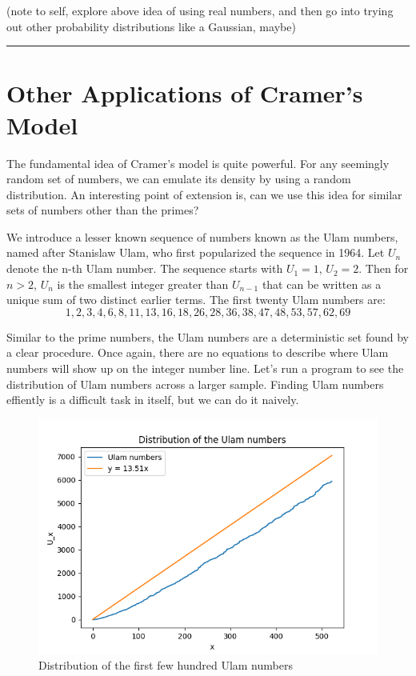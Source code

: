 \documentclass[conference]{IEEEtran}
\begin{document}
(note to self, explore above idea of using real numbers, and then
go into trying out other probability distributions like a Gaussian, maybe)

\vspace{2mm}
\hrule
\vspace{2mm}


\section{Other Applications of Cramer's Model}

The fundamental idea of Cramer's model is quite powerful. For any seemingly random set of numbers, we can emulate its density by using a random distribution. An interesting point of extension is, can we use this idea for similar sets of numbers other than the primes?

We introduce a lesser known sequence of numbers known as the Ulam numbers, named after Stanislaw Ulam, who first popularized the sequence in 1964. Let $U_n$ denote the n-th Ulam number. The sequence starts with $U_1 = 1$, $U_2 = 2$. Then for $n > 2$, $U_n$ is the smallest integer greater than $U_{n - 1}$ that can be written as a unique sum of two distinct earlier terms. The first twenty Ulam numbers are:
\[1, 2, 3, 4, 6, 8, 11, 13, 16, 18, 26, 28, 36, 38, 47, 48, 53, 57, 62, 69\]

Similar to the prime numbers, the Ulam numbers are a deterministic set found by a clear procedure. Once again, there are no equations to describe where Ulam numbers will show up on the integer number line. Let's run a program to see the distribution of Ulam numbers across a larger sample. Finding Ulam numbers effiently is a difficult task in itself, but we can do it naively. 

\begin{figure}[H]
  \centering
  \includegraphics[width=\linewidth,keepaspectratio]{../images/Figure_3.png}
  \caption{Distribution of the first few hundred Ulam numbers}
\end{figure}
\end{document}
